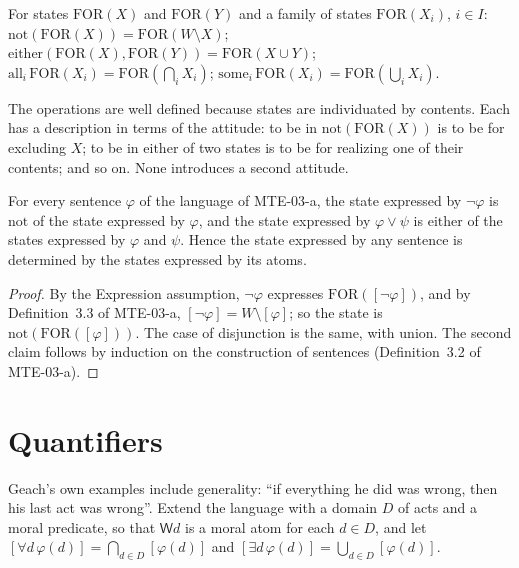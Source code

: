 \documentclass{situationist-preprint}
\begin{document}
\begin{definition}\label{d:ops}
For states $\mathrm{FOR}(X)$ and $\mathrm{FOR}(Y)$ and a family of states $\mathrm{FOR}(X_i)$, $i\in I$:
$\mathrm{not}(\mathrm{FOR}(X))=\mathrm{FOR}(W\setminus X)$; $\mathrm{either}(\mathrm{FOR}(X),\mathrm{FOR}(Y))=\mathrm{FOR}(X\cup Y)$; $\mathrm{all}_{i}\,\mathrm{FOR}(X_i)=\mathrm{FOR}(\bigcap_i X_i)$; $\mathrm{some}_{i}\,\mathrm{FOR}(X_i)=\mathrm{FOR}(\bigcup_i X_i)$.
\end{definition}

The operations are well defined because states are individuated by contents. Each has a description in terms of the attitude: to be in $\mathrm{not}(\mathrm{FOR}(X))$ is to be for excluding $X$; to be in $\mathrm{either}$ of two states is to be for realizing one of their contents; and so on. None introduces a second attitude.

\begin{proposition}[Compositionality]\label{p:comp}
For every sentence $\varphi$ of the language of MTE-03-a, the state expressed by $\neg\varphi$ is $\mathrm{not}$ of the state expressed by $\varphi$, and the state expressed by $\varphi\vee\psi$ is $\mathrm{either}$ of the states expressed by $\varphi$ and $\psi$. Hence the state expressed by any sentence is determined by the states expressed by its atoms.
\end{proposition}

\begin{proof}
By the Expression assumption, $\neg\varphi$ expresses $\mathrm{FOR}([\neg\varphi])$, and by Definition~3.3 of MTE-03-a, $[\neg\varphi]=W\setminus[\varphi]$; so the state is $\mathrm{not}(\mathrm{FOR}([\varphi]))$. The case of disjunction is the same, with union. The second claim follows by induction on the construction of sentences (Definition~3.2 of MTE-03-a).
\end{proof}

\section{Quantifiers}\label{s:quant}

Geach's own examples include generality: \enquote{if everything he did was wrong, then his last act was wrong}. Extend the language with a domain $D$ of acts and a moral predicate, so that $\mathsf{W}d$ is a moral atom for each $d\in D$, and let $[\forall d\,\varphi(d)]=\bigcap_{d\in D}[\varphi(d)]$ and $[\exists d\,\varphi(d)]=\bigcup_{d\in D}[\varphi(d)]$.
\end{document}
